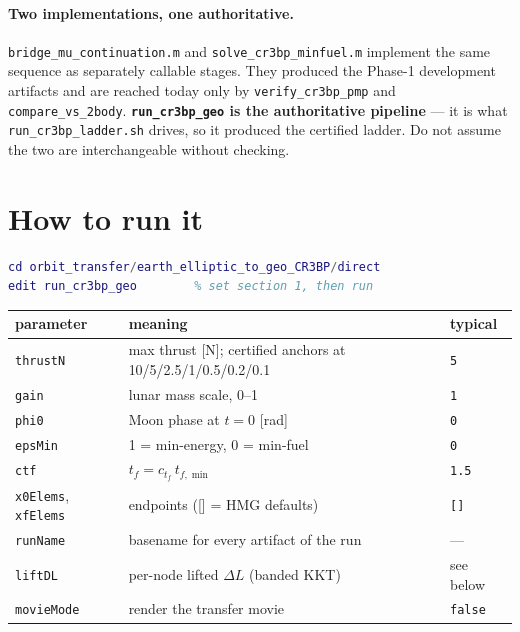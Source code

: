 \documentclass[11pt]{article}
\newcommand{\file}[1]{\texttt{#1}}
\begin{document}
\paragraph{Two implementations, one authoritative.}
\file{bridge\_mu\_continuation.m} and \file{solve\_cr3bp\_minfuel.m} implement
the same sequence as separately callable stages. They produced the Phase-1
development artifacts and are reached today only by \file{verify\_cr3bp\_pmp}
and \file{compare\_vs\_2body}. \textbf{\file{run\_cr3bp\_geo} is the
authoritative pipeline} --- it is what \file{run\_cr3bp\_ladder.sh} drives, so
it produced the certified ladder. Do not assume the two are interchangeable
without checking.

\section{How to run it}

\begin{lstlisting}[language=Matlab]
cd orbit_transfer/earth_elliptic_to_geo_CR3BP/direct
edit run_cr3bp_geo        % set section 1, then run
\end{lstlisting}

\begin{center}
\begin{tabular}{lll}
\toprule
parameter & meaning & typical \\
\midrule
\texttt{thrustN}    & max thrust [N]; certified anchors at 10/5/2.5/1/0.5/0.2/0.1 & \texttt{5} \\
\texttt{gain}       & lunar mass scale, 0--1                     & \texttt{1} \\
\texttt{phi0}       & Moon phase at $t=0$ [rad]                   & \texttt{0} \\
\texttt{epsMin}     & 1 = min-energy, 0 = min-fuel                & \texttt{0} \\
\texttt{ctf}        & $t_f = c_{t_f}\,t_{f,\min}$                 & \texttt{1.5} \\
\texttt{x0Elems}, \texttt{xfElems} & endpoints ([] = HMG defaults) & \texttt{[]} \\
\texttt{runName}    & basename for every artifact of the run      & --- \\
\texttt{liftDL}     & per-node lifted $\Delta L$ (banded KKT)     & see below \\
\texttt{movieMode}  & render the transfer movie                   & \texttt{false} \\
\bottomrule
\end{tabular}
\end{center}
\end{document}
